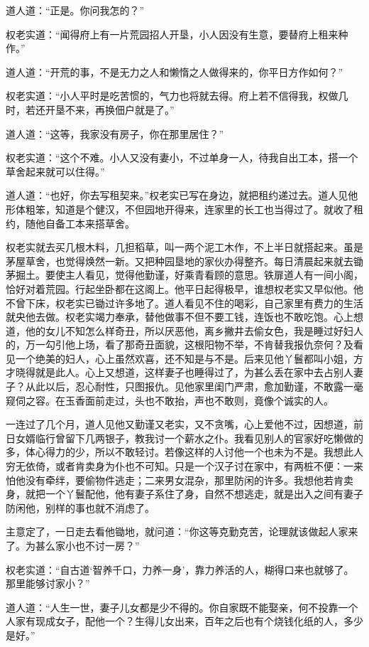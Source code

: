 \documentclass[a4paper,12pt,UTF8,twoside]{ctexbook}
\begin{document}
道人道：“正是。你问我怎的？”

权老实道：“闻得府上有一片荒园招人开垦，小人因没有生意，要替府上租来种作。”

道人道：“开荒的事，不是无力之人和懒惰之人做得来的，你平日方作如何？”

权老实道：“小人平时是吃苦惯的，气力也将就去得。府上若不信得我，权做几时，若还开垦不来，再换佃户就是了。”

道人道：“这等，我家没有房子，你在那里居住？”

权老实道：“这个不难。小人又没有妻小，不过单身一人，待我自出工本，搭一个草舍起来就可以住得。”

道人道：“也好，你去写租契来。”权老实已写在身边，就把租约递过去。道人见他形体粗笨，知道是个健汉，不但园地开得来，连家里的长工也当得过了。就收了租约，随他自备工本来搭草舍。

权老实就去买几根木料，几担稻草，叫一两个泥工木作，不上半日就搭起来。虽是茅屋草舍，也觉得焕然一新。又把种园垦地的家伙办得整齐。每日清晨起来就去锄茅掘土。要使主人看见，觉得他勤谨，好乘青看顾的意思。铁扉道人有一间小阁，恰好对着荒园。行起坐卧都在这阁上。他平日起得极早，谁想权老实又早似他。他不曾下床，权老实已锄过许多地了。道人看见不住的喝彩，自己家里有费力的生活就央他去做。权老实竭力奉承，替他做事不但不要工钱，连饭也不敢吃饱。心上想道，他的女儿不知怎么样奇丑，所以厌恶他，离乡撇井去偷女色，我是睡过好妇人的，万一勾引他上场，看了那奇丑面貌，这根阳物不举，不肯替我报仇奈何？及看见一个绝美的妇人，心上虽然欢喜，还不知是与不是。后来见他丫鬟都叫小姐，方才晓得就是此人。心上又想道，这样妻子也睡得过了，为甚么丢在家中去占别人妻子？从此以后，忍心耐性，只图报仇。见他家里闺门严肃，愈加勤谨，不敢露一毫窥伺之容。在玉香面前走过，头也不敢抬，声也不敢则，竟像个诚实的人。

一连过了几个月，道人见他又勤谨又老实，又不贪嘴，心上爱他不过，因想道，前日女婿临行曾留下几两银子，教我讨一个薪水之仆。我看见别人的官家好吃懒做的多，体心得力的少，所以不敢轻讨。若像这样的人讨他一个也未为不是。我想此人穷无依倚，或者肯卖身为仆也不可知。只是一个汉子讨在家中，有两桩不便：一来怕他没有牵绊，要偷物件逃走；二来男女混杂，那里防闲的许多。我想他若肯卖身，就把一个丫鬟配他，他有妻子系住了身，自然不想逃走，就是出入之间有妻子防闲他，别样的事也就不消虑了。

主意定了，一日走去看他锄地，就问道：“你这等克勤克苦，论理就该做起人家来了。为甚么家小也不讨一房？”

权老实道：“自古道‘智养千口，力养一身’，靠力养活的人，糊得口来也就够了。那里能够讨家小？”

道人道：“人生一世，妻子儿女都是少不得的。你自家既不能娶亲，何不投靠一个人家有现成女子，配他一个？生得儿女出来，百年之后也有个烧钱化纸的人，多少是好。”
\end{document}
